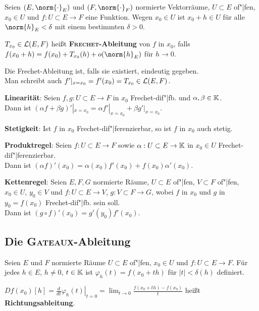 Seien $(E, \norm{\cdot}_E)$ und $(F, \norm{\cdot}_F)$ normierte Vektorräume,
$U \subset E$ of"|fen, $x_0 \in U$ und $f: U \subset E \rightarrow F$
eine Funktion.
Wegen $x_0 \in U$ ist $x_0 + h \in U$ für alle $\norm{h}_E < \delta$ mit
einem bestimmten $\delta > 0$.

$T_{x_0} \in \mathcal{L}(E, F)$ heißt \textbf{\textsc{Frechet}-Ableitung} von $f$
in $x_0$, falls \\
$f(x_0 + h) = f(x_0) + T_{x_0}(h) + o(\norm{h}_E)$ für $h \to 0$.

Die Frechet-Ableitung ist, falls sie existiert, eindeutig gegeben. \\
Man schreibt auch $f'|_{x=x_0} = f'(x_0) = T_{x_0} \in \mathcal{L}(E,F)$.

\linie

\textbf{Linearität}:
Seien $f, g: U \subset E \rightarrow F$ in $x_0$ Frechet-dif"|fb.
und $\alpha, \beta \in \mathbb{K}$. \\
Dann ist
$(\alpha f + \beta g)'|_{x=x_0} = \alpha f'|_{x=x_0} + \beta g'|_{x=x_0}$.

\textbf{Stetigkeit}:
Ist $f$ in $x_0$ Frechet-dif"|ferenzierbar, so ist $f$ in $x_0$ auch stetig.

\textbf{Produktregel}:
Seien $f: U \subset E \rightarrow F$ sowie
$\alpha: U \subset E \rightarrow \mathbb{K}$ in $x_0 \in U$
Frechet-dif"|ferenzierbar. \\
Dann ist $(\alpha f)'(x_0) = \alpha(x_0) f'(x_0) + f(x_0) \alpha'(x_0)$.

\textbf{Kettenregel}:
Seien $E, F, G$ normierte Räume, $U \subset E$ of"|fen, $V \subset F$ of"|fen,
$x_0 \in U$, $y_0 \in V$ und $f: U \subset E \rightarrow V$,
$g: V \subset F \rightarrow G$, wobei $f$ in $x_0$ und $g$ in
$y_0 = f(x_0)$ Frechet-dif"|fb. sein soll. \\
Dann ist $(g \circ f)'(x_0) = g'(y_0) f'(x_0)$.

\pagebreak

\subsection{%
    Die \textsc{Gateaux}-Ableitung%
}

Seien $E$ und $F$ normierte Räume $U \subset E$ of"|fen, $x_0 \in U$
und $f: U \subset E \rightarrow F$.
Für jedes $h \in E$, $h \not= 0$, $t \in \mathbb{K}$ ist
$\varphi_h(t) = f(x_0 + th)$ für $|t| < \delta(h)$ definiert.

$Df(x_0)[h] = \left.\frac{d}{dt} \varphi_h(t)\right|_{t=0} =
\lim_{t \to 0} \frac{f(x_0 + th) - f(x_0)}{t}$
heißt \textbf{Richtungsableitung}.

